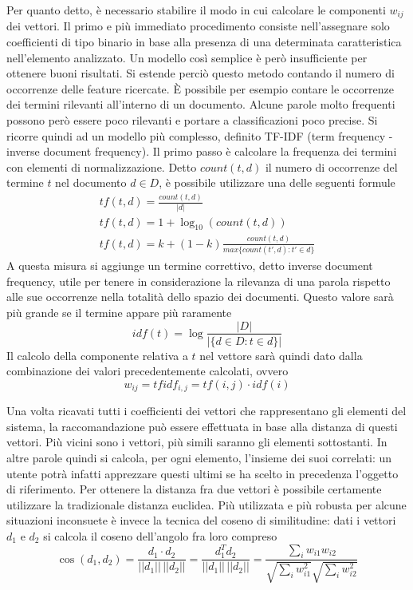 \documentclass[Lau,binding=0.6cm,noexaminfo,oneside]{sapthesis}
\begin{document}
Per quanto detto, è necessario stabilire il modo in cui calcolare le componenti $w_{ij}$ dei vettori. Il primo e più immediato procedimento consiste nell'assegnare solo coefficienti di tipo binario in base alla presenza di una determinata caratteristica nell'elemento analizzato. Un modello così semplice è però insufficiente per ottenere buoni risultati. Si estende perciò questo metodo contando il numero di occorrenze delle feature ricercate.
\MakeUppercase{è} possibile per esempio contare le occorrenze dei termini rilevanti all'interno di un documento. Alcune parole molto frequenti possono però essere poco rilevanti e portare a classificazioni poco precise. Si ricorre quindi ad un modello più complesso, definito TF-IDF (term frequency - inverse document frequency). Il primo passo è calcolare la frequenza dei termini con elementi di normalizzazione. Detto $count(t,d)$ il numero di occorrenze del termine $t$ nel documento $d \in D$, è possibile utilizzare una delle seguenti formule
\begin{gather*}
  t\!f(t,d) = \frac{count(t,d)}{|d|} \\
  t\!f(t,d) = 1 + \log_{10}(count(t,d)) \\
  t\!f(t,d) = k + (1-k) \frac{count(t,d)}{max\{count(t',d) : t' \in d\}}
\end{gather*}
A questa misura si aggiunge un termine correttivo, detto inverse document frequency, utile per tenere in considerazione la rilevanza di una parola rispetto alle sue occorrenze nella totalità dello spazio dei documenti. Questo valore sarà più grande se il termine appare più raramente
\[
idf(t) = \log \frac{|D|}{|\{d \in D : t \in d\}|}
\]
Il calcolo della componente relativa a $t$ nel vettore sarà quindi dato dalla combinazione dei valori precedentemente calcolati, ovvero
\[
w_{ij} = t\!fidf_{i,j} = t\!f(i,j) \cdot idf(i)
\]

\medskip

Una volta ricavati tutti i coefficienti dei vettori che rappresentano gli elementi del sistema, la raccomandazione può essere effettuata in base alla distanza di questi vettori. Più vicini sono i vettori, più simili saranno gli elementi sottostanti. In altre parole quindi si calcola, per ogni elemento, l'insieme dei suoi correlati: un utente potrà infatti apprezzare questi ultimi se ha scelto in precedenza l'oggetto di riferimento. Per ottenere la distanza fra due vettori è possibile certamente utilizzare la tradizionale distanza euclidea. Più utilizzata e più robusta per alcune situazioni inconsuete è invece la tecnica del coseno di similitudine: dati i vettori $d_1$ e $d_2$ si calcola il coseno dell'angolo fra loro compreso
\[
\cos(d_1, d_2) = \frac{d_1 \cdot d_2}{||d_1|| \, ||d_2||} = \frac{d_1^T d_2}{||d_1|| \, ||d_2||} = \frac{\sum_{i} w_{i1} w_{i2}}{\sqrt{\sum_{i} w_{i1}^2} \sqrt{\sum_{i} w_{i2}^2}}
\]
\end{document}

